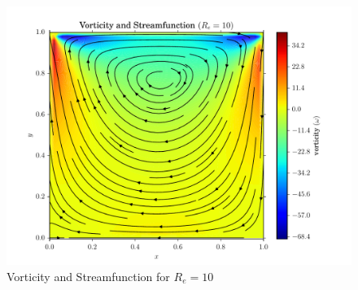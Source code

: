 \documentclass[addpoints]{exam}
\begin{document}
\begin{questions}
\begin{solution}
\begin{figure}[H]
\centering
\includegraphics[width=.75\textwidth]{figs/vorticity_streamfunction_10.pdf}
\caption{Vorticity and Streamfunction for $R_{e}=10$}
\label{fig:vorticity_streamfunction_re10}
\end{figure}


\end{solution}
\end{questions}
\end{document}
